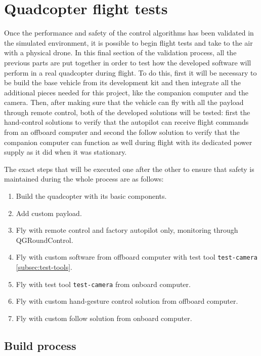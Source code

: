\section{Quadcopter flight tests}

Once the performance and safety of the control algorithms has been validated in the simulated environment, it is possible to begin flight tests and take to the air with a physical drone.
In this final section of the validation process, all the previous parts are put together in order to test how the developed software will perform in a real quadcopter during flight.
To do this, first it will be necessary to be build the base vehicle from its development kit and then integrate all the additional pieces needed for this project, like the companion computer and the camera.
Then, after making sure that the vehicle can fly with all the payload through remote control, both of the developed solutions will be tested:
first the hand-control solutions to verify that the autopilot can receive flight commands from an offboard computer and second the follow solution to verify that the companion computer can function as well during flight with its dedicated power supply as it did when it was stationary.

The exact steps that will be executed one after the other to ensure that safety is maintained during the whole process are as follows:

\begin{enumerate}
    \item Build the quadcopter with its basic components.
    \item Add custom payload.
    \item Fly with remote control and factory autopilot only, monitoring through QGRoundControl.
    \item Fly with custom software from offboard computer with test tool \texttt{test-camera} \ref{subsec:test-tools}.
    \item Fly with test tool \texttt{test-camera} from onboard computer.
    \item Fly with custom hand-gesture control solution from offboard computer.
    \item Fly with custom follow solution from onboard computer.
\end{enumerate}

\subsection{Build process}
\label{sec:test-7-builddrone}

